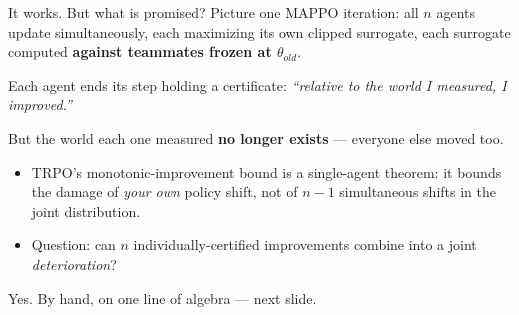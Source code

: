 \documentclass[10pt, aspectratio=169]{beamer}
\begin{document}
\begin{frame}{It works. But what is promised?}
Picture one MAPPO iteration: \alert{all $n$ agents update simultaneously}, each maximizing its own clipped surrogate, each surrogate computed \textbf{against teammates frozen at $\theta_{old}$}.
\medskip

\pause
Each agent ends its step holding a certificate: \emph{``relative to the world I measured, I improved.''}
\medskip

\pause
But the world each one measured \textbf{no longer exists} --- everyone else moved too.
\medskip

\begin{itemize}\setlength\itemsep{2pt}
\item TRPO's monotonic-improvement bound is a \alert{single-agent theorem}: it bounds the damage of \emph{your own} policy shift, not of $n-1$ simultaneous shifts in the joint distribution.
\item Question: can $n$ individually-certified improvements combine into a joint \emph{deterioration}?
\end{itemize}
\medskip
\pause
\begin{center}\large \alert{Yes. By hand, on one line of algebra --- next slide.}\end{center}
\end{frame}
\end{document}
